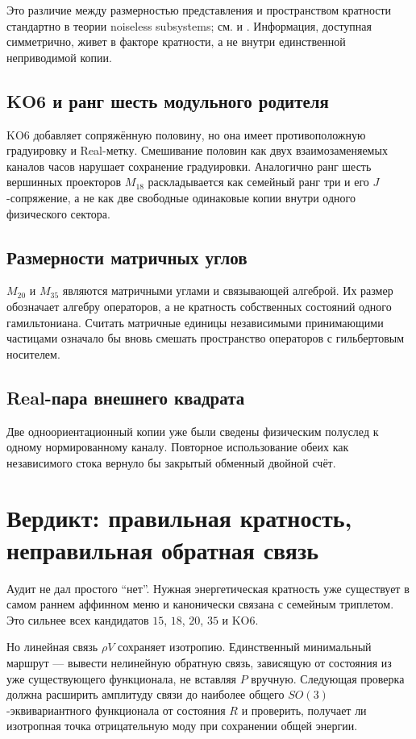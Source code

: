 Это различие между размерностью представления и пространством кратности
стандартно в теории noiseless subsystems; см.
 и
. Информация, доступная симметрично,
живет в факторе кратности, а не внутри единственной неприводимой копии.

\subsection{KO6 и ранг шесть модульного родителя}

KO6 добавляет сопряжённую половину, но она имеет противоположную
градуировку и Real-метку. Смешивание половин как двух взаимозаменяемых
каналов часов нарушает сохранение градуировки. Аналогично ранг шесть
вершинных проекторов $M_{18}$ раскладывается как семейный ранг три и его
$J$-сопряжение, а не как две свободные одинаковые копии внутри одного
физического сектора.

\subsection{Размерности матричных углов}

$M_{20}$ и $M_{35}$ являются матричными углами и связывающей алгеброй.
Их размер обозначает алгебру операторов, а не кратность собственных
состояний одного гамильтониана. Считать матричные единицы независимыми
принимающими частицами означало бы вновь смешать пространство операторов
с гильбертовым носителем.

\subsection{Real-пара внешнего квадрата}

Две одноориентационный копии уже были сведены физическим полуслед к одному
нормированному каналу. Повторное использование обеих как независимого
стока вернуло бы закрытый обменный двойной счёт.

\section{Вердикт: правильная кратность, неправильная обратная связь}

Аудит не дал простого ``нет''. Нужная энергетическая кратность уже
существует в самом раннем аффинном меню и канонически связана с семейным
триплетом. Это сильнее всех кандидатов $15$, $18$, $20$, $35$ и KO6.

Но линейная связь $\rho V$ сохраняет изотропию. Единственный минимальный
маршрут --- вывести нелинейную обратную связь, зависящую от состояния из уже
существующего функционала, не вставляя $P$ вручную. Следующая проверка должна
расширить амплитуду связи до наиболее общего $SO(3)$-эквивариантного
функционала от состояния $R$ и проверить, получает ли изотропная точка
отрицательную моду при сохранении общей энергии.

